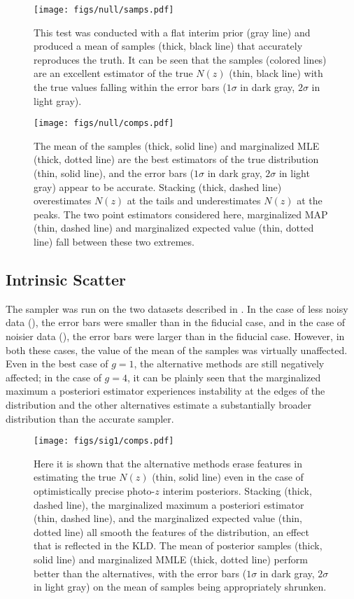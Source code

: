 \begin{figure}
	\texttt{[image: figs/null/samps.pdf]}
	\caption{This test was conducted with a flat interim prior (gray line) and produced a mean of samples (thick, black line) that accurately reproduces the truth.  
		It can be seen that the samples (colored lines) are an excellent estimator of the true $N(z)$ (thin, black line) with the true values falling within the error bars ($1\sigma$ in dark gray, $2\sigma$ in light gray).}
	\label{fig:null-samp}
\end{figure}

\begin{figure}
	\texttt{[image: figs/null/comps.pdf]}
	\caption{The mean of the samples (thick, solid line) and marginalized MLE (thick, dotted line) are the best estimators of the true distribution (thin, solid line), and the error bars ($1\sigma$ in dark gray, $2\sigma$ in light gray) appear to be accurate.  
		Stacking (thick, dashed line) overestimates $N(z)$ at the tails and underestimates $N(z)$ at the peaks.  
		The two point estimators considered here, marginalized MAP (thin, dashed line) and marginalized expected value (thin, dotted line) fall between these two 
		extremes.}
\end{figure}

\subsection{Intrinsic Scatter}

The sampler was run on the two datasets described in .  
In the case of less noisy data (), the error bars were smaller than in the fiducial case, and in the case of noisier data (), the error bars were larger than in the fiducial case.  
However, in both these cases, the value of the mean of the samples was virtually unaffected.  
Even in the best case of $g=1$, the alternative methods are still negatively affected; in the case of $g=4$, it can be plainly seen that the marginalized maximum a posteriori estimator experiences instability at the edges of the distribution and the other alternatives estimate a substantially broader distribution than the accurate sampler.

\begin{figure}
	\texttt{[image: figs/sig1/comps.pdf]}
	\caption{Here it is shown that the alternative methods erase features in estimating the true $N(z)$ (thin, solid line) even in the case of optimistically precise photo-$z$ interim posteriors.  
		Stacking (thick, dashed line), the marginalized maximum a posteriori estimator (thin, dashed line), and the marginalized expected value (thin, dotted line) all smooth the features of the distribution, an effect that is reflected in the KLD.  
		The mean of posterior samples (thick, solid line) and marginalized MMLE (thick, dotted line) perform better than the alternatives, with the error bars ($1\sigma$ in dark gray, $2\sigma$ in light gray) on the mean of samples being appropriately shrunken.}
\end{figure}

